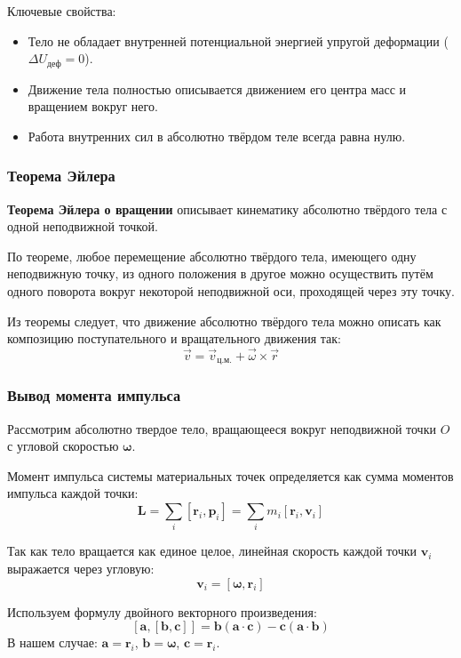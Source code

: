 Ключевые свойства:
\begin{itemize}
    \item Тело не обладает внутренней потенциальной энергией упругой деформации ($\Delta U_{деф} = 0$).
    \item Движение тела полностью описывается движением его центра масс и вращением вокруг него.
    \item Работа внутренних сил в абсолютно твёрдом теле всегда равна нулю.
\end{itemize}

\subsubsection{Теорема Эйлера}

\textbf{Теорема Эйлера о вращении} описывает кинематику абсолютно твёрдого тела с одной неподвижной точкой.

По теореме, любое перемещение абсолютно твёрдого тела, имеющего одну неподвижную точку, из одного положения в другое можно осуществить путём одного поворота вокруг некоторой неподвижной оси, проходящей через эту точку.

Из теоремы следует, что движение абсолютно твёрдого тела можно описать как композицию поступательного и вращательного движения так:
\[ \vec{v}=\vec{v}_{\text{ц.м.}}+\vec{\omega}\times\vec{r} \] 

\subsubsection{Вывод момента импульса}

Рассмотрим абсолютно твердое тело, вращающееся вокруг неподвижной точки $O$ с угловой скоростью $\boldsymbol{\omega}$.

Момент импульса системы материальных точек определяется как сумма моментов импульса каждой точки:
\[
\mathbf{L} = \sum_i [\mathbf{r}_i, \mathbf{p}_i] = \sum_i m_i [\mathbf{r}_i, \mathbf{v}_i]
\]

Так как тело вращается как единое целое, линейная скорость каждой точки $\mathbf{v}_i$ выражается через угловую:
\[
\mathbf{v}_i = [\boldsymbol{\omega}, \mathbf{r}_i]
\]

Используем формулу двойного векторного произведения:
\[
[\mathbf{a}, [\mathbf{b}, \mathbf{c}]] = \mathbf{b}(\mathbf{a} \cdot \mathbf{c}) - \mathbf{c}(\mathbf{a} \cdot \mathbf{b})
\]
В нашем случае: $\mathbf{a} = \mathbf{r}_i$, $\mathbf{b} = \boldsymbol{\omega}$, $\mathbf{c} = \mathbf{r}_i$.

